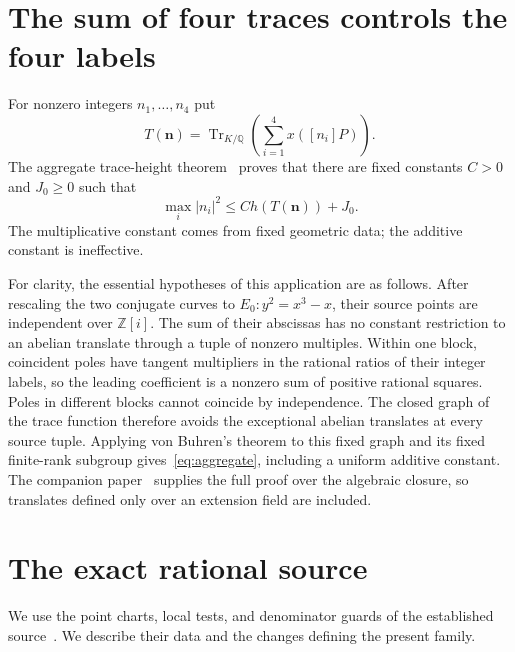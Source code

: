 \documentclass[11pt,a4paper]{article}
\newcommand{\Q}{\mathbb Q}\newcommand{\Z}{\mathbb Z}
\DeclareMathOperator{\Tr}{Tr}
\begin{document}
\section{The sum of four traces controls the four labels}

For nonzero integers $n_1,\ldots,n_4$ put
\[
 T(\mathbf n)=\Tr_{K/\Q}\left(\sum_{i=1}^4x([n_i]P)\right).
\]
The aggregate trace-height theorem~\cite{Aggregate} proves that
there are fixed constants $C>0$ and $J_0\ge0$ such that
\begin{equation}\label{eq:aggregate}
       \max_i|n_i|^2\le C h(T(\mathbf n))+J_0.
\end{equation}
The multiplicative constant comes from fixed geometric data;
the additive constant is ineffective.

For clarity, the essential hypotheses of this application are as
follows. After rescaling the two conjugate curves to
$E_0:y^2=x^3-x$, their source points are independent over
$\Z[i]$. The sum of their abscissas has no constant restriction
to an abelian translate through a tuple of nonzero multiples.
Within one block, coincident poles have tangent multipliers in
the rational ratios of their integer labels, so the leading
coefficient is a nonzero sum of positive rational squares.
Poles in different blocks cannot coincide by independence.
The closed graph of the trace function therefore avoids the
exceptional abelian translates at every source tuple. Applying
von Buhren's theorem to this fixed graph and its fixed finite-rank
subgroup gives~\eqref{eq:aggregate}, including a uniform additive
constant. The companion paper~\cite{Aggregate} supplies the full
proof over the algebraic closure, so translates defined only over
an extension field are included.

\section{The exact rational source}

We use the point charts, local tests, and denominator guards of
the established source~\cite{Baseline}. We describe their data
and the changes defining the present family.
\end{document}
